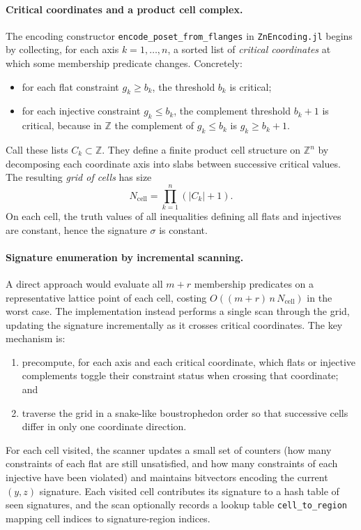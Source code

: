 \documentclass{article}
\newcommand{\<}{\langle}
\renewcommand{\>}{\rangle}
\theoremstyle{definition}
\theoremstyle{remark}
\begin{document}
	\paragraph{Critical coordinates and a product cell complex.}
	The encoding constructor \texttt{encode\_poset\_from\_flanges} in
	\texttt{ZnEncoding.jl} begins by collecting, for each axis $k=1,\dots,n$, a
	sorted list of \emph{critical coordinates} at which some membership predicate
	changes.  Concretely:
	\begin{itemize}
		\item for each flat constraint $g_k\ge b_k$, the threshold $b_k$ is critical;
		\item for each injective constraint $g_k\le b_k$, the complement threshold
		$b_k+1$ is critical, because in $\mathbb{Z}$ the complement of $g_k\le b_k$
		is $g_k\ge b_k+1$.
	\end{itemize}
	Call these lists $C_k\subset \mathbb{Z}$.  They define a finite product cell
	structure on $\mathbb{Z}^n$ by decomposing each coordinate axis into slabs between
	successive critical values.  The resulting \emph{grid of cells} has size
	\[
	N_{\mathrm{cell}} = \prod_{k=1}^n (|C_k|+1).
	\]
	On each cell, the truth values of all inequalities defining all flats and injectives
	are constant, hence the signature $\sigma$ is constant.
	
	\paragraph{Signature enumeration by incremental scanning.}
	A direct approach would evaluate all $m+r$ membership predicates on a representative
	lattice point of each cell, costing $O((m+r)\,n\,N_{\mathrm{cell}})$ in the worst
	case.  The implementation instead performs a single scan through the grid, updating
	the signature incrementally as it crosses critical coordinates.  The key mechanism
	is:
	\begin{enumerate}[label=(\roman*)]
		\item precompute, for each axis and each critical coordinate, which flats or injective
		complements toggle their constraint status when crossing that coordinate; and
		\item traverse the grid in a snake-like boustrophedon order so that successive cells differ
		in only one coordinate direction.
	\end{enumerate}
	For each cell visited, the scanner updates a small set of counters (how many
	constraints of each flat are still unsatisfied, and how many constraints of each
	injective have been violated) and maintains bitvectors encoding the current
	$(y,z)$ signature.  Each visited cell contributes its signature to a hash table of
	seen signatures, and the scan optionally records a lookup table
	\texttt{cell\_to\_region} mapping cell indices to signature-region indices.
	
\end{document}
